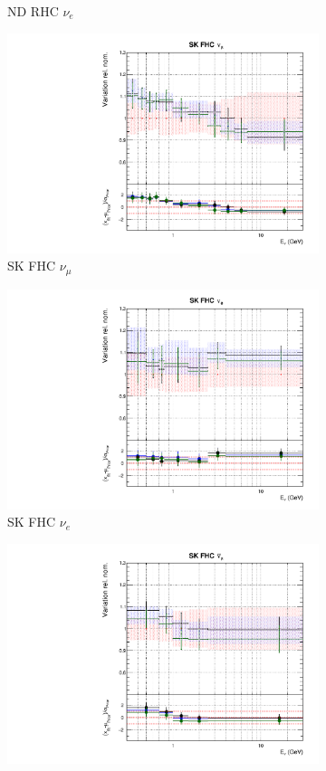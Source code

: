 \begin{figure}
\begin{subfigure}{0.24\textwidth}
  \caption{ND RHC $\nu_e$}
\end{subfigure}
\begin{subfigure}{0.24\textwidth}
  \centering
  \includegraphics[width=0.95\linewidth]{figs/newolddatafitsflux_8}
  \caption{SK FHC $\nu_{\mu}$}
\end{subfigure}
\begin{subfigure}{0.24\textwidth}
  \centering
  \includegraphics[width=0.95\linewidth]{figs/newolddatafitsflux_9}
  \caption{SK FHC $\nu_e$}
\end{subfigure}
\begin{subfigure}{0.24\textwidth}
  \centering
  \includegraphics[width=0.95\linewidth]{figs/newolddatafitsflux_10}

\end{subfigure}
\end{figure}

